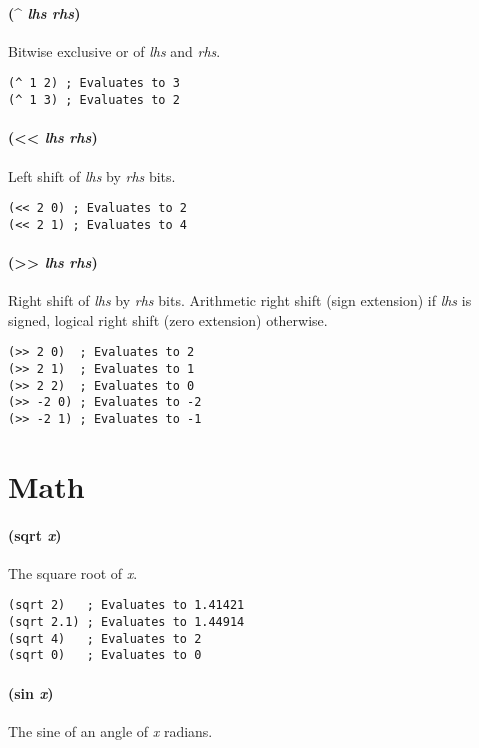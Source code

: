 \documentclass[twoside=false, numbers=noenddot]{scrbook}
\begin{document}
\paragraph{(\^{} \emph{lhs} \emph{rhs})}
Bitwise exclusive or of \emph{lhs} and \emph{rhs}.

\begin{verbatim}
(^ 1 2) ; Evaluates to 3
(^ 1 3) ; Evaluates to 2
\end{verbatim}

\paragraph{(<< \emph{lhs} \emph{rhs})}
Left shift of \emph{lhs} by \emph{rhs} bits.

\begin{verbatim}
(<< 2 0) ; Evaluates to 2
(<< 2 1) ; Evaluates to 4
\end{verbatim}

\paragraph{(>> \emph{lhs} \emph{rhs})}
Right shift of \emph{lhs} by \emph{rhs} bits.
Arithmetic right shift (sign extension) if \emph{lhs} is signed, logical right shift (zero extension) otherwise.

\begin{verbatim}
(>> 2 0)  ; Evaluates to 2
(>> 2 1)  ; Evaluates to 1
(>> 2 2)  ; Evaluates to 0
(>> -2 0) ; Evaluates to -2
(>> -2 1) ; Evaluates to -1
\end{verbatim}

\section{Math}
\paragraph{(sqrt \emph{x})}
The square root of \emph{x}.

\begin{verbatim}
(sqrt 2)   ; Evaluates to 1.41421
(sqrt 2.1) ; Evaluates to 1.44914
(sqrt 4)   ; Evaluates to 2
(sqrt 0)   ; Evaluates to 0
\end{verbatim}

\paragraph{(sin \emph{x})}
The sine of an angle of \emph{x} radians.
\end{document}
